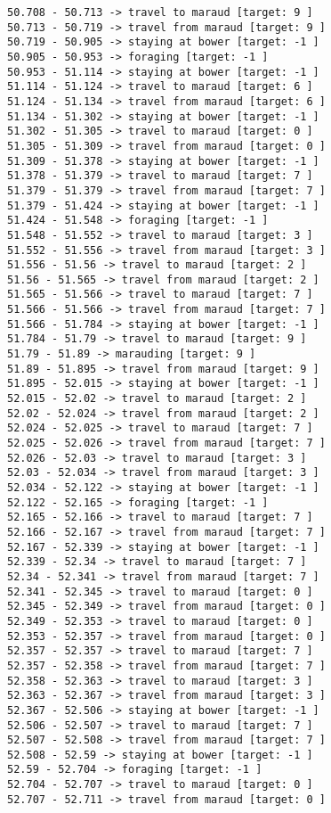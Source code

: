 \documentclass[11pt]{article}
\begin{document}
\begin{Verbatim}[commandchars=\\\{\}]
50.708 - 50.713 -> travel to maraud [target: 9 ]
50.713 - 50.719 -> travel from maraud [target: 9 ]
50.719 - 50.905 -> staying at bower [target: -1 ]
50.905 - 50.953 -> foraging [target: -1 ]
50.953 - 51.114 -> staying at bower [target: -1 ]
51.114 - 51.124 -> travel to maraud [target: 6 ]
51.124 - 51.134 -> travel from maraud [target: 6 ]
51.134 - 51.302 -> staying at bower [target: -1 ]
51.302 - 51.305 -> travel to maraud [target: 0 ]
51.305 - 51.309 -> travel from maraud [target: 0 ]
51.309 - 51.378 -> staying at bower [target: -1 ]
51.378 - 51.379 -> travel to maraud [target: 7 ]
51.379 - 51.379 -> travel from maraud [target: 7 ]
51.379 - 51.424 -> staying at bower [target: -1 ]
51.424 - 51.548 -> foraging [target: -1 ]
51.548 - 51.552 -> travel to maraud [target: 3 ]
51.552 - 51.556 -> travel from maraud [target: 3 ]
51.556 - 51.56 -> travel to maraud [target: 2 ]
51.56 - 51.565 -> travel from maraud [target: 2 ]
51.565 - 51.566 -> travel to maraud [target: 7 ]
51.566 - 51.566 -> travel from maraud [target: 7 ]
51.566 - 51.784 -> staying at bower [target: -1 ]
51.784 - 51.79 -> travel to maraud [target: 9 ]
51.79 - 51.89 -> marauding [target: 9 ]
51.89 - 51.895 -> travel from maraud [target: 9 ]
51.895 - 52.015 -> staying at bower [target: -1 ]
52.015 - 52.02 -> travel to maraud [target: 2 ]
52.02 - 52.024 -> travel from maraud [target: 2 ]
52.024 - 52.025 -> travel to maraud [target: 7 ]
52.025 - 52.026 -> travel from maraud [target: 7 ]
52.026 - 52.03 -> travel to maraud [target: 3 ]
52.03 - 52.034 -> travel from maraud [target: 3 ]
52.034 - 52.122 -> staying at bower [target: -1 ]
52.122 - 52.165 -> foraging [target: -1 ]
52.165 - 52.166 -> travel to maraud [target: 7 ]
52.166 - 52.167 -> travel from maraud [target: 7 ]
52.167 - 52.339 -> staying at bower [target: -1 ]
52.339 - 52.34 -> travel to maraud [target: 7 ]
52.34 - 52.341 -> travel from maraud [target: 7 ]
52.341 - 52.345 -> travel to maraud [target: 0 ]
52.345 - 52.349 -> travel from maraud [target: 0 ]
52.349 - 52.353 -> travel to maraud [target: 0 ]
52.353 - 52.357 -> travel from maraud [target: 0 ]
52.357 - 52.357 -> travel to maraud [target: 7 ]
52.357 - 52.358 -> travel from maraud [target: 7 ]
52.358 - 52.363 -> travel to maraud [target: 3 ]
52.363 - 52.367 -> travel from maraud [target: 3 ]
52.367 - 52.506 -> staying at bower [target: -1 ]
52.506 - 52.507 -> travel to maraud [target: 7 ]
52.507 - 52.508 -> travel from maraud [target: 7 ]
52.508 - 52.59 -> staying at bower [target: -1 ]
52.59 - 52.704 -> foraging [target: -1 ]
52.704 - 52.707 -> travel to maraud [target: 0 ]
52.707 - 52.711 -> travel from maraud [target: 0 ]

\end{Verbatim}
\end{document}

